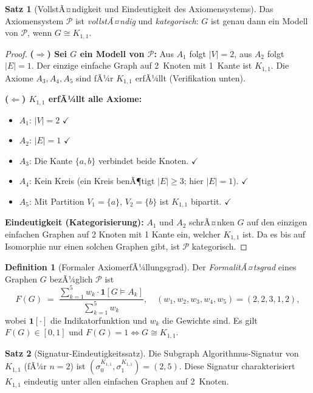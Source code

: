 ﻿\documentclass[a4paper,12pt]{article}
\theoremstyle{definition}
\newtheorem{definition}{Definition}
\newtheorem{satz}{Satz}
\begin{document}
\begin{satz}[VollstÃ¤ndigkeit und Eindeutigkeit des Axiomensystems]
	\label{satz:axiome}
	Das Axiomensystem $\mathcal{P}$ ist \emph{vollstÃ¤ndig} und \emph{kategorisch}:
	$G$ ist genau dann ein Modell von $\mathcal{P}$, wenn $G \cong K_{1,1}$.
\end{satz}

\begin{proof}
	\textbf{($\Rightarrow$) Sei $G$ ein Modell von $\mathcal{P}$:}
	Aus $A_1$ folgt $|V| = 2$, aus $A_2$ folgt $|E| = 1$.
	Der einzige einfache Graph auf 2~Knoten mit 1~Kante ist $K_{1,1}$.
	Die Axiome $A_3, A_4, A_5$ sind fÃ¼r $K_{1,1}$ erfÃ¼llt (Verifikation unten).
	
	\textbf{($\Leftarrow$) $K_{1,1}$ erfÃ¼llt alle Axiome:}
	\begin{itemize}
		\item $A_1$: $|V| = 2$ $\checkmark$
		\item $A_2$: $|E| = 1$ $\checkmark$
		\item $A_3$: Die Kante $\{a,b\}$ verbindet beide Knoten. $\checkmark$
		\item $A_4$: Kein Kreis (ein Kreis benÃ¶tigt $|E| \geq 3$; hier $|E|=1$). $\checkmark$
		\item $A_5$: Mit Partition $V_1 = \{a\}$, $V_2 = \{b\}$ ist $K_{1,1}$ bipartit. $\checkmark$
	\end{itemize}
	
	\textbf{Eindeutigkeit (Kategorisierung):} $A_1$ und $A_2$ schrÃ¤nken $G$
	auf den einzigen einfachen Graphen auf 2 Knoten mit 1 Kante ein, welcher $K_{1,1}$
	ist. Da es bis auf Isomorphie nur einen solchen Graphen gibt, ist $\mathcal{P}$
	kategorisch. \qedhere
\end{proof}

\begin{definition}[Formaler AxiomerfÃ¼llungsgrad]
	\label{def:formal}
	Der \emph{FormalitÃ¤tsgrad} eines Graphen $G$ bezÃ¼glich $\mathcal{P}$ ist
	\[
		F(G) \;=\; \frac{\sum_{k=1}^5 w_k \cdot \mathbf{1}[G \models A_k]}{\sum_{k=1}^5 w_k},
		\quad (w_1,w_2,w_3,w_4,w_5) = (2,2,3,1,2),
	\]
	wobei $\mathbf{1}[\cdot]$ die Indikatorfunktion und $w_k$ die Gewichte sind.
	Es gilt $F(G) \in [0,1]$ und $F(G) = 1 \iff G \cong K_{1,1}$.
\end{definition}

\begin{satz}[Signatur-Eindeutigkeitssatz]
	\label{satz:signatur}
	Die Subgraph Algorithmus-Signatur von $K_{1,1}$ (fÃ¼r $n = 2$) ist
	$(\sigma_0^{K_{1,1}}, \sigma_1^{K_{1,1}}) = (2, 5)$.
	Diese Signatur charakterisiert $K_{1,1}$ eindeutig unter allen einfachen
	Graphen auf 2~Knoten.
\end{satz}
\end{document}
